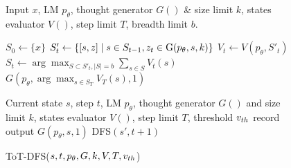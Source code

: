 \documentclass{article}
\begin{document}
\begin{figure}[ht]
\vspace{-15pt}
  \begin{minipage}{0.50\textwidth}
    \begin{algorithm}[H]
      \caption{ToT-BFS($x, p_\theta, G, k, V, T, b$)}
      \label{alg:bfs}
      \begin{algorithmic}
\Require Input $x$, LM $p_\theta$, thought generator $G()$ \& size limit $k$, states evaluator $V()$, step limit $T$, breadth limit $b$.

\State $S_0 \gets \{ x \}$
    \State $S'_t \gets \{ [s, z] \mid s \in S_{t-1}, z_t \in {\color{black}\mathrm{G}}(p_\theta, s, k) \}$  %
    \State $V_t \gets V(p_\theta, S'_t)$ %
    \State $S_t \gets \arg \max_{S \subset S'_t, |S| = b} \sum_{s \in S} V_t(s)$ %
\EndFor \\
\Return $G(p_\theta, \arg \max_{s \in S_T} V_T(s), 1)$
\end{algorithmic}
    \end{algorithm}
  \end{minipage}\hfill
  \begin{minipage}{0.49\textwidth}
    \begin{algorithm}[H]
      \caption{ToT-DFS($s, t, p_\theta, G, k, V, T, v_{\small th}$)}
      \label{alg:dfs}
      \begin{algorithmic}
\Require Current state $s$, step $t$, LM $p_\theta$, thought generator $G()$ and size limit $k$, states evaluator $V()$, step limit $T$, threshold $v_{\small th}$
{record output $G(p_\theta, s, 1)$} 
\EndIf
{} 
   
\State DFS$(s', t+1)$
\EndIf
\EndFor
\end{algorithmic}
    \end{algorithm}
  \end{minipage}
  \vspace{-9pt}
\end{figure}
\end{document}

